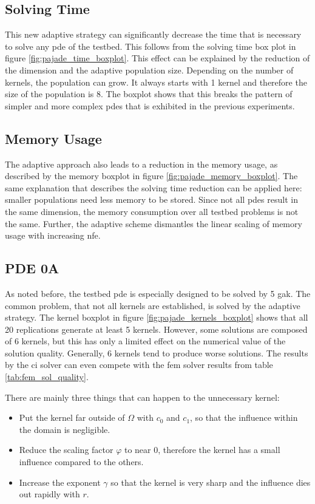 \documentclass[./\jobname.tex]{subfiles}
\begin{document}
\subsection{Solving Time}

This new adaptive strategy can significantly decrease the time that is necessary to solve any \gls{pde} of the testbed. This follows from the solving time box plot in figure \ref{fig:pajade_time_boxplot}. This effect can be explained by the reduction of the dimension and the adaptive population size. Depending on the number of kernels, the population can grow. It always starts with 1 kernel and therefore the size of the population is 8. The boxplot shows that this breaks the pattern of simpler and more complex \gls{pde}s that is exhibited in the previous experiments.

\subsection{Memory Usage}
The adaptive approach also leads to a reduction in the memory usage, as described by the memory boxplot in figure \ref{fig:pajade_memory_boxplot}. The same explanation that describes the solving time reduction can be applied here: smaller populations need less memory to be stored. Since not all \gls{pde}s result in the same dimension, the memory consumption over all testbed problems is not the same. Further, the adaptive scheme dismantles the linear scaling of memory usage with increasing \gls{nfe}. 

\subsection{PDE 0A}
\label{chap:ex2_discussion_pde0a}
As noted before, the testbed \gls{pde} is especially designed to be solved by 5 \gls{gak}. The common problem, that not all kernels are established, is solved by the adaptive strategy. The kernel boxplot in figure \ref{fig:pajade_kernels_boxplot} shows that all 20 replications generate at least 5 kernels. However, some solutions are composed of 6 kernels, but this has only a limited effect on the numerical value of the solution quality. Generally, 6 kernels tend to produce worse solutions. The results by the \gls{ci} solver can even compete with the \gls{fem} solver results from table \ref{tab:fem_sol_quality}.

There are mainly three things that can happen to the unnecessary kernel: 
\begin{itemize}
	\item Put the kernel far outside of $\Omega$ with $c_0$ and $c_1$, so that the influence within the domain is negligible.
	\item Reduce the scaling factor $\varphi$ to near 0, therefore the kernel has a small influence compared to the others.
	\item Increase the exponent $\gamma$ so that the kernel is very sharp and the influence dies out rapidly with $r$.
\end{itemize}
\end{document}
